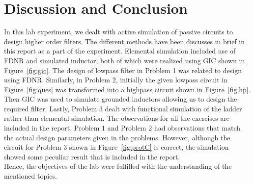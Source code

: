 \documentclass{lab_sheet}
\begin{document}
\section{Discussion and Conclusion}
In this lab experiment, we dealt with active simulation of passive circuits to design higher order filters. The different methods have been discusses in brief in this report as a part of the experiment. Elemental simulation included use of FDNR and simulated inductor, both of which were realized using GIC shown in Figure~\ref{fig:gic}. The design of lowpass filter in Problem 1 was related to design using FDNR. Similarly, in Problem 2, initially the given lowpass circuit in Figure~\ref{fig:ques} was transformed into a highpass circuit shown in Figure~\ref{fig:hp}. Then GIC was used to simulate grounded inductors allowing us to design the required filter. Lastly, Problem 3 dealt with functional simulation of the ladder rather than elemental simulation. The observations for all the exercises are included in the report. Problem 1 and Problem 2 had observations that match the actual design parameters given in the problems. However, although the circuit for Problem 3 shown in Figure~\ref{fig:protC} is correct, the simulation showed some peculiar result that is included in the report.
\\
Hence, the objectives of the lab were fulfilled with the understanding of the mentioned topics.
\end{document}
